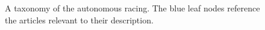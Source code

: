 \begin{figure}[h]
    \centering
    
    \caption[A taxonomy of the autonomous racing literature with articles]{A taxonomy of the autonomous racing. The blue leaf nodes reference the articles relevant to their description.}
    \label{fig:literature_taxonomy_1}
\end{figure}

